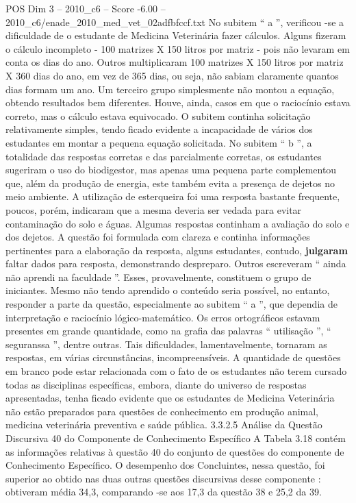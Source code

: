 \begin{textsample}{POS Dim 3 – 2010\_c6 – Score -6.00 – 2010\_c6/enade\_2010\_med\_vet\_02adfbfccf.txt}
No subitem “ a ”, verificou -se a dificuldade de o estudante de Medicina Veterinária fazer cálculos.
Alguns fizeram o cálculo incompleto - 100 matrizes X 150 litros por matriz - pois não levaram em conta os dias do ano.
Outros multiplicaram 100 matrizes X 150 litros por matriz X 360 dias do ano, em vez de 365 dias, ou seja, não sabiam claramente quantos dias formam um ano.
Um terceiro grupo simplesmente não montou a equação, obtendo resultados bem diferentes.
Houve, ainda, casos em que o raciocínio estava correto, mas o cálculo estava equivocado.
O subitem continha solicitação relativamente simples, tendo ficado evidente a incapacidade de vários dos estudantes em montar a pequena equação solicitada.
No subitem “ b ”, a totalidade das respostas corretas e das parcialmente corretas, os estudantes sugeriram o uso do biodigestor, mas apenas uma pequena parte complementou que, além da produção de energia, este também evita a presença de dejetos no meio ambiente.
A utilização de esterqueira foi uma resposta bastante frequente, poucos, porém, indicaram que a mesma deveria ser vedada para evitar contaminação do solo e águas.
Algumas respostas continham a avaliação do solo e dos dejetos.
A questão foi formulada com clareza e continha informações pertinentes para a elaboração da resposta, alguns estudantes, contudo, \textbf{julgaram} faltar dados para resposta, demonstrando despreparo.
Outros escreveram “ ainda não aprendi na faculdade ”.
Esses, provavelmente, constituem o grupo de iniciantes.
Mesmo não tendo aprendido o conteúdo seria possível, no entanto, responder a parte da questão, especialmente ao subitem “ a ”, que dependia de interpretação e raciocínio lógico-matemático.
Os erros ortográficos estavam presentes em grande quantidade, como na grafia das palavras “ utilisação ”, “ seguranssa ”, dentre outras.
Tais dificuldades, lamentavelmente, tornaram as respostas, em várias circunstâncias, incompreensíveis.
A quantidade de questões em branco pode estar relacionada com o fato de os estudantes não terem cursado todas as disciplinas específicas, embora, diante do universo de respostas apresentadas, tenha ficado evidente que os estudantes de Medicina Veterinária não estão preparados para questões de conhecimento em produção animal, medicina veterinária preventiva e saúde pública. 3.3.2.5 Análise da Questão Discursiva 40 do Componente de Conhecimento Específico A Tabela 3.18 contém as informações relativas à questão 40 do conjunto de questões do componente de Conhecimento Específico.
O desempenho dos Concluintes, nessa questão, foi superior ao obtido nas duas outras questões discursivas desse componente : obtiveram média 34,3, comparando -se aos 17,3 da questão 38 e 25,2 da 39.

\end{textsample}
